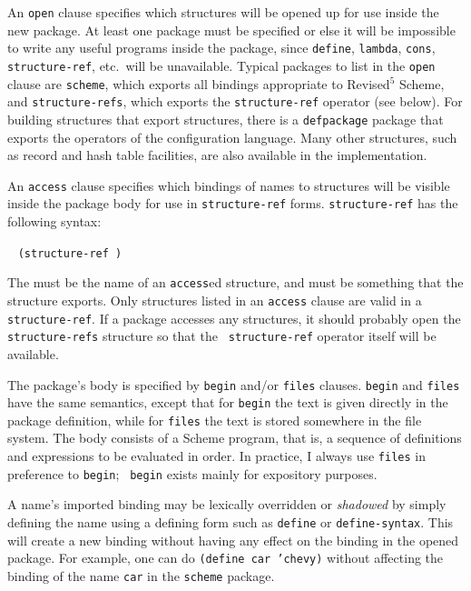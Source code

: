 An {\tt open} clause specifies which structures will be opened up for
use inside the new package.  At least one package must be specified or
else it will be impossible to write any useful programs inside the
package, since {\tt define}, {\tt lambda}, {\tt cons}, {\tt
structure-ref}, etc.\ will be unavailable.  Typical packages to list
in the {\tt open} clause are {\tt scheme}, which exports all bindings
appropriate to Revised$^5$ Scheme, and {\tt structure-refs}, which
exports the {\tt structure-ref} operator (see below).  For building
structures that export structures, there is a {\tt defpackage} package
that exports the operators of the configuration language.  Many other
structures, such as record and hash table facilities, are also
available in the \hack{} implementation.

An {\tt access} clause specifies which bindings of names to structures
will be visible inside the package body for use in {\tt structure-ref}
forms.  {\tt structure-\ok{}ref} has the following syntax:
\begin{tabbing}
\qquad {} \goesto{}~
   \tt(structure-ref  )
\end{tabbing}
The  must be the name of an {\tt access}ed structure,
and  must be something that the structure exports.  Only
structures listed in an {\tt access} clause are valid in a {\tt
structure-ref}.  If a package accesses any structures, it should
probably open the {\tt structure-refs} structure so that the {\tt
structure-ref} operator itself will be available.

The package's body is specified by {\tt begin} and/or {\tt files}
clauses.  {\tt begin} and {\tt files} have the same semantics, except
that for {\tt begin} the text is given directly in the package
definition, while for {\tt files} the text is stored somewhere in the
file system.  The body consists of a Scheme program, that is, a
sequence of definitions and expressions to be evaluated in order.  In
practice, I always use {\tt files} in preference to {\tt begin}; {\tt
begin} exists mainly for expository purposes.

A name's imported binding may be lexically overridden or {\em shadowed}
by simply defining the name using a defining form such as {\tt define}
or {\tt define-\ok{}syntax}.  This will create a new binding without having
any effect on the binding in the opened package.  For example, one can
do {\tt(define car 'chevy)} without affecting the binding of the name
{\tt car} in the {\tt scheme} package.

